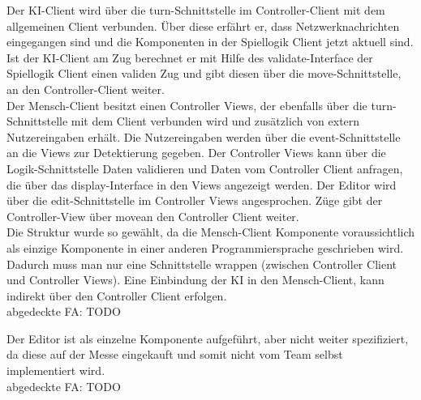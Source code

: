 Der KI-Client wird über die turn-Schnittstelle im Controller-Client mit dem allgemeinen Client verbunden. Über diese erfährt er, dass Netzwerknachrichten eingegangen sind und die Komponenten in der Spiellogik Client jetzt aktuell sind. Ist der KI-Client am Zug berechnet er mit Hilfe des validate-Interface der Spiellogik Client einen validen Zug und gibt diesen über die move-Schnittstelle, an den Controller-Client weiter.\\
Der Mensch-Client besitzt einen Controller Views, der ebenfalls über die turn-Schnittstelle mit dem Client verbunden wird und zusätzlich von extern Nutzereingaben erhält. Die Nutzereingaben werden über die event-Schnittstelle an die Views zur Detektierung gegeben. Der Controller Views kann über die Logik-Schnittstelle Daten validieren und Daten vom Controller Client anfragen, die über das display-Interface in den Views angezeigt werden. Der Editor wird über die edit-Schnittstelle im Controller Views angesprochen. Züge gibt der Controller-View über \glqq move\grqq an den Controller Client weiter.\\
Die Struktur wurde so gewählt, da die Mensch-Client Komponente voraussichtlich als einzige Komponente in einer anderen Programmiersprache geschrieben wird. Dadurch muss man nur eine Schnittstelle wrappen (zwischen Controller Client und Controller Views). Eine Einbindung der KI in den Mensch-Client, kann indirekt über den Controller Client erfolgen.\\
abgedeckte FA: TODO\\


Der Editor ist als einzelne Komponente aufgeführt, aber nicht weiter spezifiziert, da diese auf der Messe eingekauft und somit nicht vom Team selbst implementiert wird.\\ 
abgedeckte FA: TODO\\
